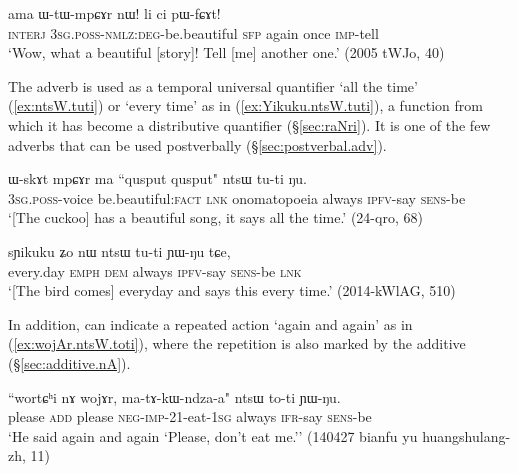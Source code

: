 \begin{exe}
\ex \label{ex:lici.pWfCAt}
\gll ama ɯ-tɯ-mpɕɤr nɯ! li ci pɯ-fɕɤt! \\
\textsc{interj} \textsc{3sg}.\textsc{poss}-\textsc{nmlz}:\textsc{deg}-be.beautiful \textsc{sfp} again once \textsc{imp}-tell \\
\glt `Wow, what a beautiful [story]! Tell [me] another one.' (2005 tWJo, 40)
\end{exe}
 
 The adverb  is used as a temporal universal quantifier `all the time' (\ref{ex:ntsW.tuti}) or `every time' as in (\ref{ex:Yikuku.ntsW.tuti}), a function from which it has become a distributive quantifier (§\ref{sec:raNri}). It is one of the few adverbs that can be used postverbally (§\ref{sec:postverbal.adv}).

\begin{exe}
\ex \label{ex:ntsW.tuti}
\gll  ɯ-skɤt mpɕɤr ma {``qusput qusput"} ntsɯ tu-ti ŋu. \\
\textsc{3sg}.\textsc{poss}-voice be.beautiful:\textsc{fact} \textsc{lnk} onomatopoeia always \textsc{ipfv}-say \textsc{sens}-be \\
\glt `[The cuckoo] has a beautiful song, it says  all the time.' (24-qro, 68)
 \end{exe} 
 
\begin{exe}
\ex \label{ex:Yikuku.ntsW.tuti}
\gll   sɲikuku ʑo nɯ ntsɯ tu-ti ɲɯ-ŋu tɕe, \\
every.day \textsc{emph} \textsc{dem} always \textsc{ipfv}-say \textsc{sens}-be \textsc{lnk} \\
\glt `[The bird comes] everyday and says this every time.'  (2014-kWlAG, 510)
 \end{exe}
 
In addition,  can indicate a repeated action `again and again' as in (\ref{ex:wojAr.ntsW.toti}), where the repetition is also marked by the additive  (§\ref{sec:additive.nA}).

\begin{exe}
\ex \label{ex:wojAr.ntsW.toti}
\gll ``wortɕʰi nɤ wojɤr, ma-tɤ-kɯ-ndza-a" ntsɯ to-ti ɲɯ-ŋu. \\
please \textsc{add} please \textsc{neg}-\textsc{imp}-2\fl{}1-eat-\textsc{1sg} always \textsc{ifr}-say \textsc{sens}-be \\
\glt `He said again and again `Please, don't eat me.'' (140427 bianfu yu huangshulang-zh, 11)
\end{exe}

